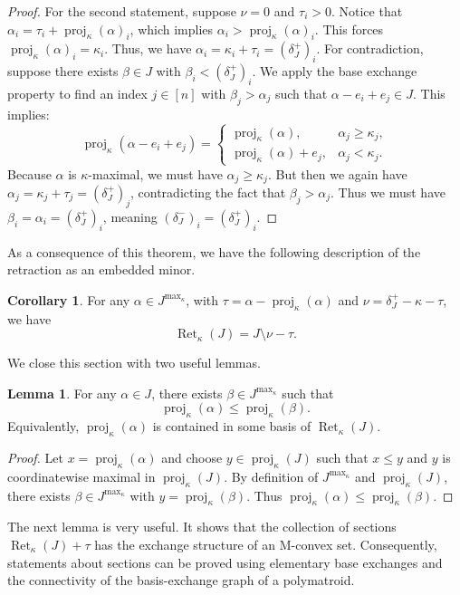\documentclass[11pt]{article}
\theoremstyle{definition}
\newtheorem{lemma}[theorem]{Lemma}
\newtheorem{corollary}[theorem]{Corollary}
\theoremstyle{remark}
\newcommand{\delplus}{\delta_J^+}
\newcommand{\delminus}{\delta_J^-}
\DeclareMathOperator{\proj}{proj}              %
\newcommand{\kproj}{\proj_{\kappa}}            %
\DeclareMathOperator{\Ret}{Ret}                %
\newcommand{\RetK}{\Ret_{\kappa}}              %
\newcommand{\Jmax}{J^{\max_{\kappa}}}
\begin{document}
\begin{proof}
    For the second statement, suppose $\nu = 0$ and $\tau_i > 0$. Notice that $\alpha_i = \tau_i + \kproj(\alpha)_i$, which implies $\alpha_i > \kproj(\alpha)_i$. This forces $\kproj(\alpha)_i = \kappa_i$. Thus, we have $\alpha_i = \kappa_i + \tau_i = (\delplus)_i$. For contradiction, suppose there exists $\beta \in J$ with $\beta_i < (\delplus)_i$. We apply the base exchange property to find an index $j \in [n]$ with $\beta_j > \alpha_j$ such that $\alpha - e_i + e_j \in J$. This implies: 
    \[
    \kproj(\alpha - e_i + e_j) = \begin{cases}
        \kproj(\alpha), & \alpha_j \geq \kappa_j, \\
        \kproj(\alpha) + e_j, & \alpha_j < \kappa_j.
    \end{cases}
    \]
    Because $\alpha$ is $\kappa$-maximal, we must have $\alpha_j \geq \kappa_j$. But then we again have $\alpha_j = \kappa_j + \tau_j = (\delplus)_j$, contradicting the fact that $\beta_j > \alpha_j$. Thus we must have $\beta_i = \alpha_i = (\delplus)_i$, meaning $(\delminus)_i = (\delplus)_i$.
\end{proof}

As a consequence of this theorem, we have the following description of the retraction as an embedded minor.
\begin{corollary} \label{corollary:description_of_embedded_minor}
    For any $\alpha \in \Jmax$, with $\tau = \alpha - \kproj(\alpha)$ and $\nu = \delplus - \kappa - \tau$, we have \[
    \RetK(J) = J \setminus \nu - \tau.
    \]
\end{corollary}

We close this section with two useful lemmas.

\begin{lemma}\label{lemma:projection_always_independent}
    For any $\alpha\in J$, there exists $\beta\in\Jmax$ such that
    \[
        \kproj(\alpha)\leq\kproj(\beta).
    \]
    Equivalently, $\kproj(\alpha)$ is contained in some basis of $\RetK(J)$.
\end{lemma}
\begin{proof}
    Let $x = \kproj(\alpha)$ and choose $y \in \kproj(J)$ such that $x \leq y$ and $y$ is coordinatewise maximal in $\kproj(J)$. By definition of $\Jmax$ and $\kproj(J)$, there exists $\beta \in \Jmax$ with $y = \kproj(\beta)$. Thus $\kproj(\alpha) \leq \kproj(\beta)$.
\end{proof}

The next lemma is very useful. It shows that the collection of sections $\RetK(J)+\tau$ has the exchange structure of an M-convex set. Consequently, statements about sections can be proved using elementary base exchanges and the connectivity of the basis-exchange graph of a polymatroid.
\end{document}
